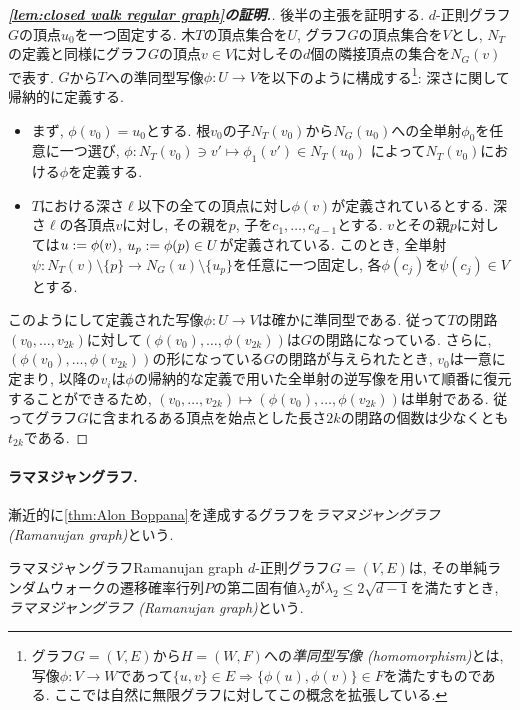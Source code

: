 \begin{proof}[\textbf{\cref{lem:closed walk regular graph}の証明.}]
    後半の主張を証明する.
    $d$-正則グラフ$G$の頂点$u_0$を一つ固定する.
    木$T$の頂点集合を$U$, グラフ$G$の頂点集合を$V$とし,
    $N_T$の定義と同様にグラフ$G$の頂点$v \in V$に対しその$d$個の隣接頂点の集合を$N_G(v)$で表す.
    $G$から$T$への準同型写像$\phi \colon U \to V$を以下のように構成する\footnote{グラフ$G=(V,E)$から$H=(W,F)$への\emph{準同型写像 (homomorphism)}とは, 写像$\phi\colon V\to W$であって$\{u,v\}\in E\Rightarrow \{\phi(u),\phi(v)\}\in F$を満たすものである. ここでは自然に無限グラフに対してこの概念を拡張している.}:
        深さに関して帰納的に定義する.
        \begin{itemize}
        \item まず, $\phi(v_0) = u_0$とする.
        根$v_0$の子$N_T(v_0)$から$N_G(u_0)$への全単射$\phi_0$を任意に一つ選び,
        $\phi\colon N_T(v_0) \ni v' \mapsto \phi_1(v') \in N_T(u_0)$
        によって$N_T(v_0)$における$\phi$を定義する.
        \item $T$における深さ$\ell$以下の全ての頂点に対し$\phi(v)$が定義されているとする. 深さ$\ell$の各頂点$v$に対し, その親を$p$, 子を$c_1,\dots,c_{d-1}$とする. $v$とその親$p$に対しては$u\mathrel{:=} \phi(v)$, $u_p\mathrel{:=} \phi(p)\in U$が定義されている. このとき, 全単射$\psi\colon N_T(v)\setminus \{p\} \to N_G(u)\setminus\{u_p\}$を任意に一つ固定し, 各$\phi(c_j)$を$\psi(c_j)\in V$とする.
        \end{itemize}
    このようにして定義された写像$\phi\colon U \to V$は確かに準同型である.
    従って$T$の閉路$(v_0,\dots,v_{2k})$に対して$(\phi(v_0),\dots,\phi(v_{2k}))$は$G$の閉路になっている.
    さらに, $(\phi(v_0),\dots,\phi(v_{2k}))$の形になっている$G$の閉路が与えられたとき, $v_0$は一意に定まり, 以降の$v_i$は$\phi$の帰納的な定義で用いた全単射の逆写像を用いて順番に復元することができるため, $(v_0,\dots,v_{2k}) \mapsto (\phi(v_0),\dots,\phi(v_{2k}))$は単射である.
        従ってグラフ$G$に含まれるある頂点を始点とした長さ$2k$の閉路の個数は少なくとも$t_{2k}$である.
\end{proof}


\paragraph*{ラマヌジャングラフ.}
漸近的に\cref{thm:Alon Boppana}を達成するグラフを\emph{ラマヌジャングラフ (Ramanujan graph)}という.
\begin{definition}{ラマヌジャングラフ}{Ramanujan graph}
    $d$-正則グラフ$G=(V,E)$は, その単純ランダムウォークの遷移確率行列$P$の第二固有値$\lambda_2$が$\lambda_2 \le 2\sqrt{d-1}$を満たすとき, \emph{ラマヌジャングラフ (Ramanujan graph)}という.
\end{definition}


